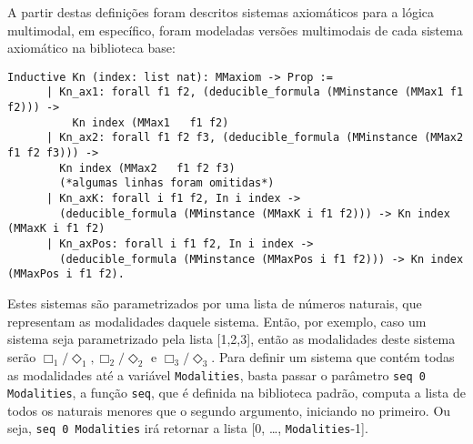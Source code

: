       A partir destas definições foram descritos sistemas axiomáticos para a lógica multimodal, em específico, foram modeladas versões multimodais de cada sistema axiomático na
      biblioteca base:
      \begin{lstlisting}[language=coq]
    Inductive Kn (index: list nat): MMaxiom -> Prop :=
      | Kn_ax1: forall f1 f2, (deducible_formula (MMinstance (MMax1 f1 f2))) ->
          Kn index (MMax1   f1 f2)
      | Kn_ax2: forall f1 f2 f3, (deducible_formula (MMinstance (MMax2 f1 f2 f3))) ->
        Kn index (MMax2   f1 f2 f3)
        (*algumas linhas foram omitidas*)
      | Kn_axK: forall i f1 f2, In i index ->
        (deducible_formula (MMinstance (MMaxK i f1 f2))) -> Kn index (MMaxK i f1 f2)
      | Kn_axPos: forall i f1 f2, In i index ->
        (deducible_formula (MMinstance (MMaxPos i f1 f2))) -> Kn index (MMaxPos i f1 f2).
      \end{lstlisting}
      Estes sistemas são parametrizados por uma lista de números naturais, que representam as modalidades daquele sistema. Então, por exemplo, caso um sistema seja parametrizado
      pela lista [1,2,3], então as modalidades deste sistema serão \(\Box_{1}/\Diamond_{1}, \Box_{2}/\Diamond_{2} \text{ e } \Box_{3}/\Diamond_{3}\).
      Para definir um sistema que contém todas as modalidades até a variável \texttt{Modalities}, basta passar o parâmetro \texttt{seq 0 Modalities},
      a função \texttt{seq}, que é definida na biblioteca padrão, computa a lista de todos os naturais menores que o segundo argumento, iniciando no primeiro. Ou seja,
      \texttt{seq 0 Modalities} irá retornar a lista [0, \dots, \texttt{Modalities}-1].

